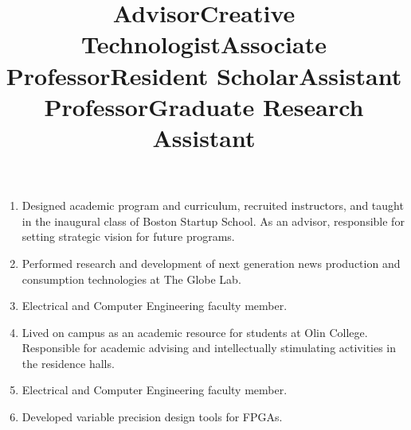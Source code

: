 \documentclass[line]{res}
\begin{document}
\begin{resume}
\begin{enumerate}
		\item	{} 
		\title{Advisor} 
		 
		\begin{position}
			Designed academic program and curriculum, recruited instructors, and taught in the inaugural class of Boston Startup School. As an advisor, responsible for setting strategic vision for future programs.
		\end{position}

		\item {} 
		\title{Creative Technologist} 
		  
		\begin{position}
			Performed research and development of next generation news production and consumption
	    technologies at The Globe Lab.
		\end{position}

		\item {} 
		\title{Associate Professor} 
		  
		\begin{position}
			Electrical and Computer Engineering faculty member. 
		\end{position}
		
		\item {} 
		\title{Resident Scholar} 
		  
		\begin{position}
			Lived on campus as an academic resource for students at Olin College. Responsible for academic advising and intellectually stimulating activities in the residence halls. 
		\end{position}
		
		\item {} 
		\title{Assistant Professor} 
		  
		\begin{position}
			Electrical and Computer Engineering faculty member. 
		\end{position}
		
		\item {} 
		\title{Graduate Research Assistant} 
		  
		\begin{position}
			Developed variable precision design tools for FPGAs. 
		\end{position}
		

\end{enumerate}
\end{resume}
\end{document}
